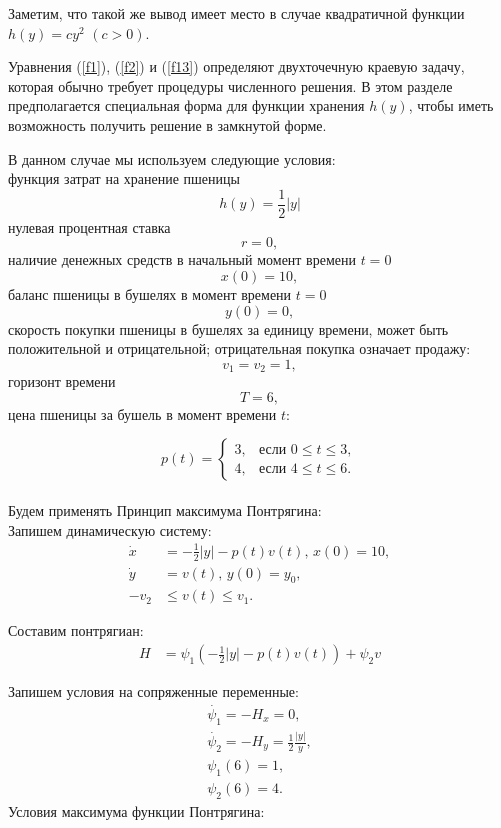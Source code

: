 Заметим, что такой же вывод имеет место в случае квадратичной функции $ h(y) = c y^2 $ $(c>0)$.
 
 
Уравнения (\ref{f1}), (\ref{f2}) и (\ref{f13}) определяют двухточечную краевую задачу, которая обычно требует процедуры численного решения. В этом разделе предполагается специальная форма для функции хранения ${h (y)}$, чтобы иметь возможность получить решение в замкнутой форме.

В данном случае мы используем следующие условия:\\
функция затрат на хранение пшеницы $$ {h(y)} = \frac{1}{2}|y|$$
нулевая процентная ставка $$ {r} = 0, $$
наличие денежных средств в начальный  момент времени $t=0$ $$ {x(0)} = 10, $$
баланс пшеницы в бушелях в момент времени $t = 0$ $$ {y(0)} = 0, $$
скорость покупки пшеницы в бушелях за единицу времени, может быть положительной и отрицательной; отрицательная покупка означает продажу: $$ {v_{1}} = {v_{2}} = 1, $$
горизонт времени $$ {T} = 6, $$
цена пшеницы за бушель в момент времени $t$:

\begin{displaymath}
p(t) =\left\{ \begin{array}{ll}
 3, & \textrm{если $0 \le t\le 3,$}\\
 4, & \textrm{если $4  \le t  \le 6.$}
  \end{array} \right.
\end{displaymath}\\


Будем применять Принцип максимума Понтрягина:\\

Запишем динамическую систему:
\begin{align}
    \Dot{x} & = - \frac{1}{2}|y| - p(t) v(t),\, x(0) = 10, \\
    \Dot{y} & = v(t), \, y(0) = y_{0},\\
    - v_2 & \le v(t) \le v_1.
\end{align}     

Составим понтрягиан: 
\begin{align}
{H} & = \psi_{1} (- \frac{1}{2}|y| - p(t) v(t)) + \psi_{2} v
\end{align} 

Запишем условия на сопряженные переменные:
\begin{gather}
 \Dot{\psi_{1}} = -H_x = 0,\\
 \Dot{\psi_{2}} = -H_y =  \frac{1}{2}\frac{|y|}{y}, \label{f21}\\
    {\psi_{1}(6)} = 1,\\
    {\psi_{2}(6)} = 4.\label{f23}
\end{gather}
Условия максимума функции Понтрягина:


